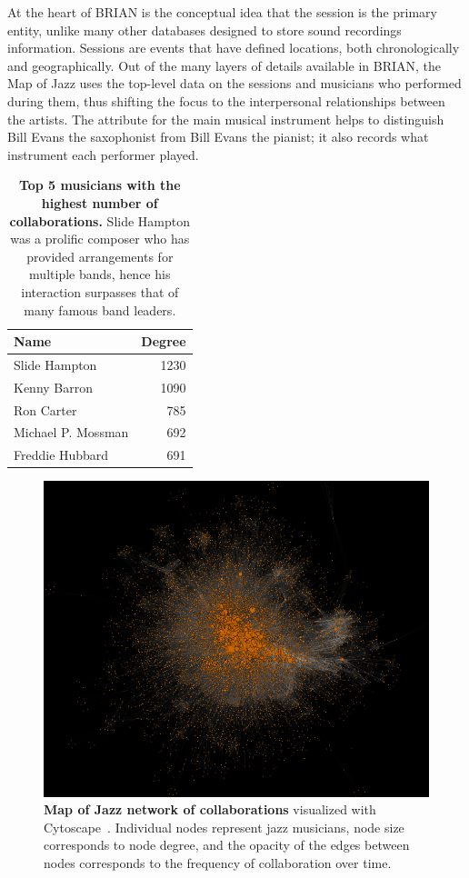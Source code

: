 \documentclass[12pt]{cmuthesis}
\begin{document}
  At the heart of BRIAN is the conceptual idea that the session is the primary entity, unlike many other databases designed to store sound recordings information. Sessions are events that have defined locations, both chronologically and geographically. Out of the many layers of details available in BRIAN, the Map of Jazz uses the top-level data on the sessions and musicians who performed during them, thus shifting the focus to the interpersonal relationships between the artists. The attribute for the main musical instrument helps to distinguish Bill Evans the saxophonist from Bill Evans the pianist; it also records what instrument each performer played.
  \begin{table}
    \centering
    \begin{tabular}{l  r}
    \toprule
    Name & Degree \\
    \midrule
    Slide Hampton & 1230\\
    Kenny Barron & 1090\\
    Ron Carter & 785\\
    Michael P. Mossman & 692\\
    Freddie Hubbard & 691\\
    \bottomrule
    \end{tabular}
    \caption{\textbf{Top 5 musicians with the highest number of collaborations.} Slide
    Hampton was a prolific composer who has provided arrangements for multiple
    bands, hence his interaction surpasses that of many famous band leaders.}
    \label{tab:high_degree}
  \end{table}


  \begin{figure}[t]
    \centering
    \includegraphics[width=\linewidth]{figures/full_network_cropped.png}
    \caption{\textbf{Map of Jazz network of collaborations} visualized with Cytoscape~\cite{Cytoscape}. Individual nodes represent jazz musicians, node size corresponds to node degree, and the opacity of the edges between nodes corresponds to the frequency of collaboration over time.}
    \label{fig:moj:fullnetwork}
  \end{figure}
\end{document}

